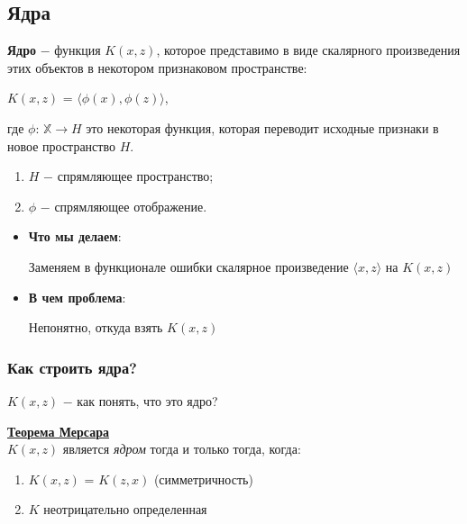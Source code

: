     \subsection{Ядра}
    \begin{definition}
        \textbf{Ядро} $-$ функция $K(x, z)$, которое представимо в виде скалярного произведения этих объектов в некотором признаковом пространстве:
        \begin{center}
            $K(x, z)$ = $\langle \phi(x), \phi(z) \rangle$,
        \end{center}

         где $\phi$: $\mathbb{X} \to H$ это некоторая функция, которая переводит исходные признаки в новое пространство $H$.
         \begin{enumerate}
             \item $H$ $-$ спрямляющее пространство;
             \item $\phi$ $-$ спрямляющее отображение.\\
         \end{enumerate}
         \hline
    \end{definition}

    \begin{itemize}
        \item{\textbf{Что мы делаем}}:

        Заменяем в функционале ошибки скалярное произведение $\langle x, z \rangle$ на $K(x, z)$

        \item{\textbf{В чем проблема}}:

        Непонятно, откуда взять $K(x, z)$
    \end{itemize}
    
    \subsubsection{Как строить ядра?}

        $K(x, z)$ $-$ как понять, что это ядро?

        \begin{theorem}
            \underline{\textbf{Теорема Мерсара}}\\

            $K(x, z)$ является \textit{ядром} тогда и только тогда, когда:
            \begin{enumerate}
                \item $K(x, z)$ = $K(z, x)$ (симметричность)

                \item $K$ неотрицательно определенная 
            \end{enumerate}
        \end{theorem}


